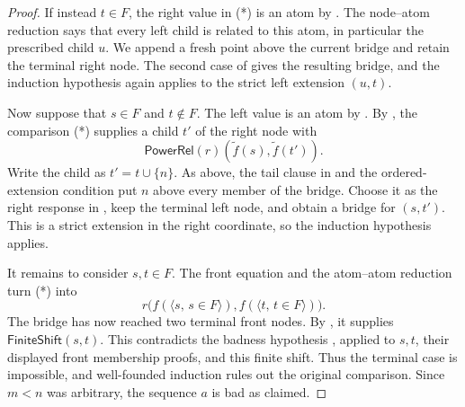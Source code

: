 \begin{proof}
If instead $t\in F$, the right value in (*) is an atom by
.  The node--atom reduction
 says that every left child is related to this
atom, in particular the prescribed child $u$.  We append a fresh point
above the current bridge and retain the terminal right node.  The second
case of  gives the resulting bridge, and the
induction hypothesis again applies to the strict left extension $(u,t)$.

Now suppose that $s\in F$ and $t\notin F$.  The left value is an atom by
.  By , the
comparison (*) supplies a child $t'$ of the right node with
\[
\mathsf{PowerRel}(r)(\widetilde f(s),\widetilde f(t')).
\]
Write the child as $t'=t\cup\{n\}$.  As above, the tail clause in
 and the ordered-extension condition put $n$ above
every member of the bridge.  Choose it as the right response in
, keep the terminal left node,
and obtain a bridge for $(s,t')$.  This is a strict extension in the
right coordinate, so the induction hypothesis applies.

It remains to consider $s,t\in F$.  The front equation
 and the atom--atom reduction
 turn (*) into
\[
r\bigl(f(\langle s,\,s\in F\rangle),
       f(\langle t,\,t\in F\rangle)\bigr).
\]
The bridge has now reached two terminal front nodes.  By
, it supplies
$\mathsf{FiniteShift}(s,t)$.  This contradicts the badness hypothesis
, applied to $s,t$, their displayed front
membership proofs, and this finite shift.  Thus the terminal case is
impossible, and well-founded induction rules out the original comparison.
Since $m<n$ was arbitrary, the sequence $a$ is bad as claimed.
\end{proof}
